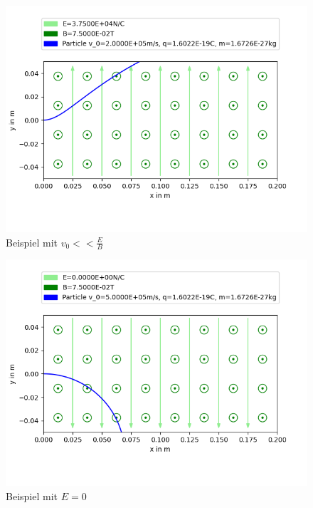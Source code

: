 \documentclass[a4paper, 10pt]{article}
\begin{document}
\begin{figure}[ht]
\caption{Beispiel mit $v_0<<\frac{E}{B}$}
\centering
\includegraphics[width=\textwidth]{figure_5}
\end{figure}
\begin{figure}[ht]
\caption{Beispiel mit $E=0$}
\centering
\includegraphics[width=\textwidth]{figure_6}
\end{figure}
\end{document}
